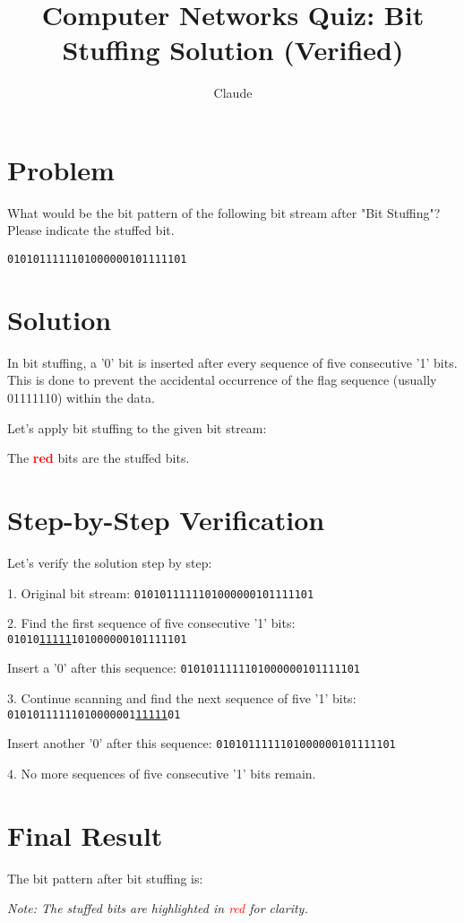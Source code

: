 \documentclass{article}
\title{Computer Networks Quiz: Bit Stuffing Solution (Verified)}
\author{Claude}
\date{}
\begin{document}
\maketitle

\section*{Problem}
What would be the bit pattern of the following bit stream after "Bit Stuffing"? Please indicate the stuffed bit.

\begin{center}
\texttt{0101011111101000000101111101}
\end{center}

\section*{Solution}
In bit stuffing, a '0' bit is inserted after every sequence of five consecutive '1' bits. This is done to prevent the accidental occurrence of the flag sequence (usually 01111110) within the data.

Let's apply bit stuffing to the given bit stream:

\begin{center}
\end{center}

The \textcolor{red}{\textbf{red}} bits are the stuffed bits.

\section*{Step-by-Step Verification}
Let's verify the solution step by step:

1. Original bit stream: \texttt{0101011111101000000101111101}

2. Find the first sequence of five consecutive '1' bits:
   \texttt{01010\underline{11111}101000000101111101}
   
   Insert a '0' after this sequence:
   \texttt{0101011111101000000101111101}

3. Continue scanning and find the next sequence of five '1' bits:
   \texttt{01010111111010000001\underline{11111}01}
   
   Insert another '0' after this sequence:
   \texttt{0101011111101000000101111101}

4. No more sequences of five consecutive '1' bits remain.

\section*{Final Result}
The bit pattern after bit stuffing is:

\begin{center}
\end{center}

\textit{Note: The stuffed bits are highlighted in \textcolor{red}{red} for clarity.}
\end{document}
